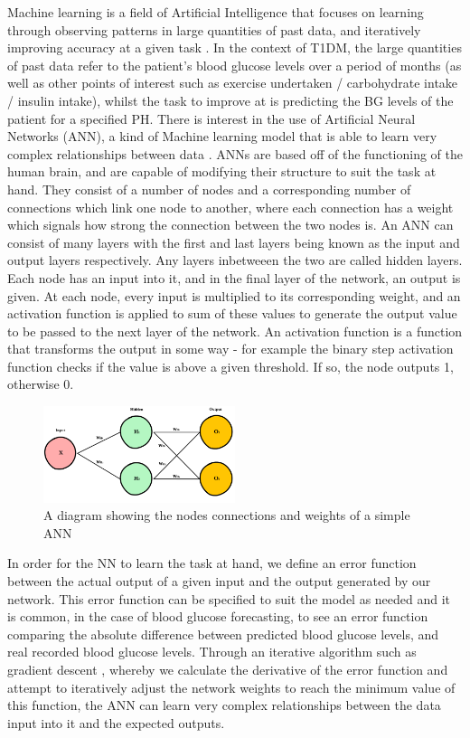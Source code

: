       Machine learning is a field of Artificial Intelligence that focuses on learning through observing patterns in large quantities of past data, and iteratively improving accuracy at a given task \cite{whatisml}. In the context of T1DM, the large quantities of past data refer to the patient's blood glucose levels over a period of months (as well as other points of interest such as exercise undertaken / carbohydrate intake / insulin intake), whilst the task to improve at is predicting the BG levels of the patient for a specified PH. There is interest in the use of Artificial Neural Networks (ANN), a kind of Machine learning model that is able to learn very complex relationships between data \cite{whatisnn}. ANNs are based off of the functioning of the human brain, and are capable of modifying their structure to suit the task at hand. They consist of a number of nodes and a corresponding number of connections which link one node to another, where each connection has a weight which signals how strong the connection between the two nodes is. An ANN can consist of many layers with the first and last layers being known as the input and output layers respectively. Any layers inbetweeen the two are called hidden layers. Each node has an input into it, and in the final layer of the network, an output is given. At each node, every input is multiplied to its corresponding weight, and an activation function is applied to sum of these values to generate the output value to be passed to the next layer of the network. An activation function is a function that transforms the output in some way - for example the binary step activation function checks if the value is above a given threshold. If so, the node outputs 1, otherwise 0.
      \begin{figure}[H]
        \centering
        \includegraphics[width=0.5\textwidth]{images/basicNN.png}
        \caption{
         A diagram showing the nodes connections and weights of a simple ANN \cite{whatisnnimage}
        }
      \end{figure}
      In order for the NN to learn the task at hand, we define an error function between the actual output of a given input and the output generated by our network. This error function can be specified to suit the model as needed and it is common, in the case of blood glucose forecasting, to see an error function comparing the absolute difference between predicted blood glucose levels, and real recorded blood glucose levels. Through an iterative algorithm such as gradient descent \cite{whatisgd}, whereby we calculate the derivative of the error function and attempt to iteratively adjust the network weights to reach the minimum value of this function, the ANN can learn very complex relationships between the data input into it and the expected outputs. 
